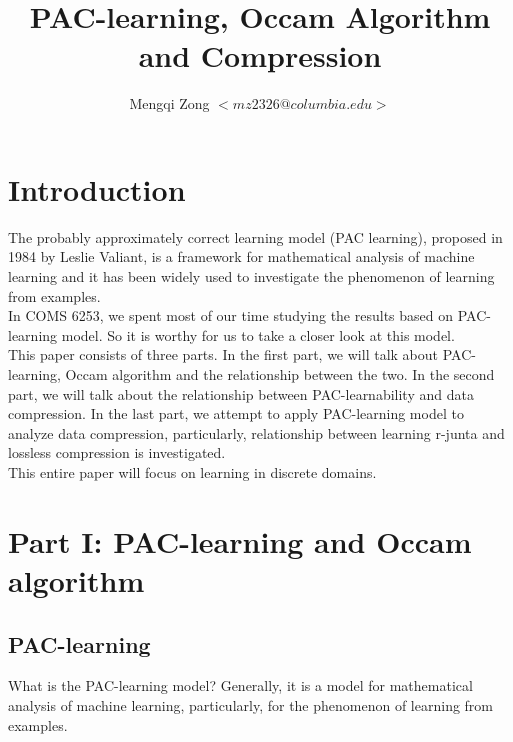 \documentclass[12pt]{article}
\title{PAC-learning, Occam Algorithm and Compression}
\author{Mengqi Zong $<mz2326@columbia.edu>$}
\begin{document}
\maketitle

\setlength{\parindent}{0in}

\thispagestyle{plain}

\section{Introduction}


The probably approximately correct learning model (PAC learning), proposed in 1984 by Leslie Valiant, is a framework for mathematical analysis of machine learning and it has been widely used to investigate the phenomenon of learning from examples. \\

In COMS 6253, we spent most of our time studying the results based on PAC-learning model. So it is worthy for us to take a closer look at this model. \\

This paper consists of three parts. In the first part, we will talk about PAC-learning, Occam algorithm and the relationship between the two. In the second part, we will talk about the relationship between PAC-learnability and data compression. In the last part, we attempt to apply PAC-learning model to analyze data compression, particularly, relationship between learning r-junta and lossless compression is investigated. \\

This entire paper will focus on learning in discrete domains. 


\section{Part I: PAC-learning and Occam algorithm}

\subsection{PAC-learning}


What is the PAC-learning model? Generally, it is a model for mathematical analysis of machine learning, particularly, for the phenomenon of learning from examples. \\
\end{document}
